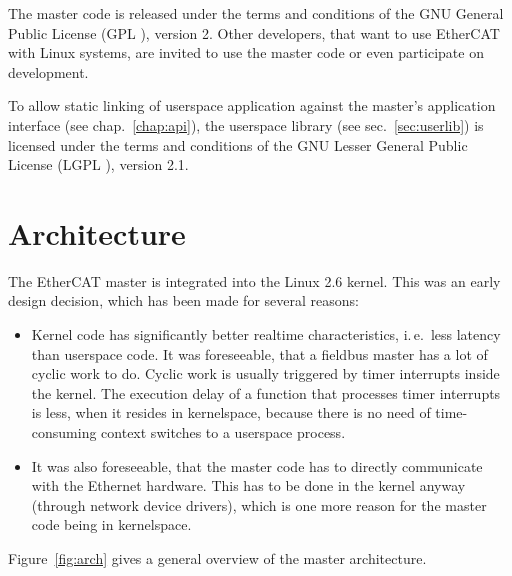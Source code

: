 \documentclass[a4paper,12pt,BCOR6mm,bibtotoc,idxtotoc]{scrbook}
\begin{document}
The master code is released under the terms and conditions of the GNU General
Public License (GPL \cite{gpl}), version 2. Other developers, that
want to use EtherCAT with Linux systems, are invited to use the master code or
even participate on development.

To allow static linking of userspace application against the master's
application interface (see chap.~\ref{chap:api}), the userspace library (see
sec.~\ref{sec:userlib}) is licensed under the terms and conditions of the GNU
Lesser General Public License (LGPL \cite{lgpl}), version 2.1.


\chapter{Architecture}
\label{chap:arch}

The EtherCAT master is integrated into the Linux 2.6 kernel. This was
an early design decision, which has been made for several reasons:

\begin{itemize}

\item Kernel code has significantly better realtime characteristics, i.\,e.\
less latency than userspace code. It was foreseeable, that a fieldbus master
has a lot of cyclic work to do. Cyclic work is usually triggered by timer
interrupts inside the kernel. The execution delay of a function that processes
timer interrupts is less, when it resides in kernelspace, because there is no
need of time-consuming context switches to a userspace process.

\item It was also foreseeable, that the master code has to directly
communicate with the Ethernet hardware. This has to be done in the kernel
anyway (through network device drivers), which is one more reason for the
master code being in kernelspace.

\end{itemize}

Figure~\ref{fig:arch} gives a general overview of the master architecture.
\end{document}
